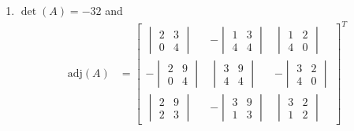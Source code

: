 \begin{Answer}
\begin{enumerate}[label=(\alph*)]
\begin{align*}
\begin{array}{@{}ccc|ccc@{}}
0 & 1 & 0 & -\frac{1}{4} & \frac{3}{4} & 0 \\
0 & 0 & 1 & \frac{1}{4} & -\frac{1}{4} & -\frac{1}{8}
\end{array}\right] & 
R_3 - R_2 \to R_3 \\
\to &
\left[\begin{array}{@{}ccc|ccc@{}}
1 & 0 & 0 & -\frac{1}{4} & \frac{1}{4} & \frac{3}{8} \\
0 & 1 & 0 & -\frac{1}{4} & \frac{3}{4} & 0 \\
0 & 0 & 1 & \frac{1}{4} & -\frac{1}{4} & -\frac{1}{8}
\end{array}\right] & 
R_1 - 3R_3 - 2R_2 \to R_1 
\end{align*}
\item $\det(A) = -32$ and
\begin{align*}
\text{adj}(A) &=
\begin{bmatrix}
\begin{vmatrix}
2 & 3 \\
0 & 4
\end{vmatrix} &
-\begin{vmatrix}
1 & 3 \\
4 & 4
\end{vmatrix} &
\begin{vmatrix}
1 & 2 \\
4 & 0
\end{vmatrix} 
\\
-\begin{vmatrix}
2 & 9 \\
0 & 4
\end{vmatrix} &
\begin{vmatrix}
3 & 9 \\
4 & 4
\end{vmatrix} &
-\begin{vmatrix}
3 & 2 \\
4 & 0
\end{vmatrix}
\\
\begin{vmatrix}
2 & 9 \\
2 & 3
\end{vmatrix} &
-\begin{vmatrix}
3 & 9 \\
1 & 3
\end{vmatrix} &
\begin{vmatrix}
3 & 2 \\
1 & 2
\end{vmatrix} 
\end{bmatrix}^T \\

\end{align*}
\end{enumerate}
\end{Answer}
